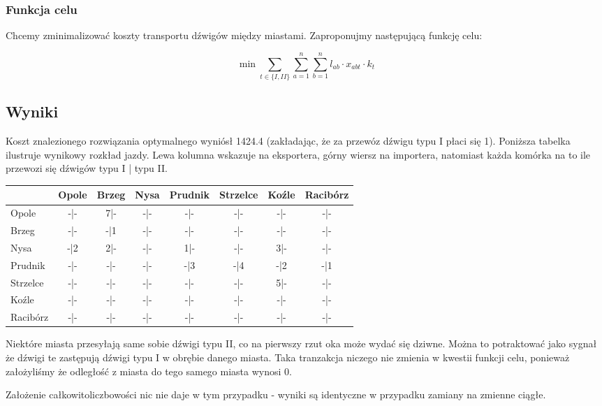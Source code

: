 \documentclass{article}
\theoremstyle{definition}
\theoremstyle{remark}
\theoremstyle{plain}
\theoremstyle{remark}
\theoremstyle{plain}
\begin{document}
\subsubsection{Funkcja celu}
Chcemy zminimalizować koszty transportu dźwigów między miastami. Zaproponujmy następującą funkcję celu:

\[ \min {\sum_{t \in \{I,II\}}{\sum_{a=1}^{n}{\sum_{b=1}^{n}{l_{ab} \cdot x_{abt} \cdot k_t}}}} \]

\subsection{Wyniki}
Koszt znalezionego rozwiązania optymalnego wyniósł 1424.4 (zakładając, że za przewóz dźwigu typu I płaci się 1).
Poniższa tabelka ilustruje wynikowy rozkład jazdy. Lewa kolumna wskazuje na eksportera, górny wiersz na importera,
natomiast każda komórka na to ile przewozi się dźwigów typu I | typu II.

\begin{table}[H]
    \centering
    \begin{tabular}{|l|c|c|c|c|c|c|c|} \hline
     & Opole & Brzeg & Nysa & Prudnik & Strzelce & Koźle & Racibórz\\\hline
    Opole & -|- & 7|- & -|- & -|- & -|- & -|- & -|-\\\hline
    Brzeg & -|- & -|1 & -|- & -|- & -|- & -|- & -|-\\\hline
    Nysa & -|2 & 2|- & -|- & 1|- & -|- & 3|- & -|-\\\hline
    Prudnik & -|- & -|- & -|- & -|3 & -|4 & -|2 & -|1\\\hline
    Strzelce & -|- & -|- & -|- & -|- & -|- & 5|- & -|-\\\hline
    Koźle & -|- & -|- & -|- & -|- & -|- & -|- & -|-\\\hline
    Racibórz & -|- & -|- & -|- & -|- & -|- & -|- & -|-\\\hline
    \end{tabular}
\end{table}

Niektóre miasta przesyłają same sobie dźwigi typu II, co na pierwszy rzut oka może wydać się dziwne.
Można to potraktować jako sygnał że dźwigi te zastępują dźwigi typu I w obrębie danego miasta.
Taka tranzakcja niczego nie zmienia w kwestii funkcji celu, ponieważ założyliśmy że odległość z miasta do tego samego miasta wynosi 0.

Założenie całkowitoliczbowości nic nie daje w tym przypadku - wyniki są identyczne w przypadku zamiany na zmienne ciągłe.
\end{document}
